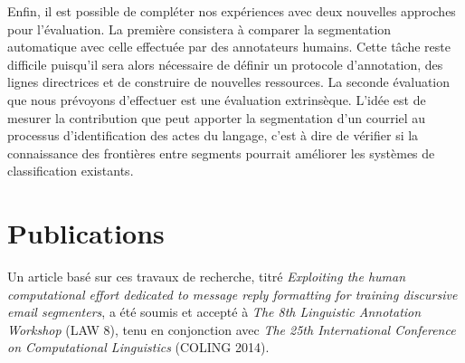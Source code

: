 Enfin, il est possible de compléter nos expériences avec deux nouvelles approches pour l'évaluation. La première consistera à comparer la segmentation automatique avec celle effectuée par des annotateurs humains. Cette tâche reste difficile puisqu'il sera alors nécessaire de définir un protocole d'annotation, des lignes directrices et de construire de nouvelles ressources. La seconde évaluation que nous prévoyons d'effectuer est une évaluation extrinsèque. L'idée est de mesurer la contribution que peut apporter la segmentation d'un courriel au processus d'identification des actes du langage, c'est à dire de vérifier si la connaissance des frontières entre segments pourrait améliorer les systèmes de classification existants.

\section{Publications}

Un article basé sur ces travaux de recherche, titré \textit{Exploiting the human computational effort dedicated to message reply formatting for training discursive email segmenters}, a été soumis et accepté à \textit{The 8th Linguistic Annotation Workshop} (LAW 8), tenu en conjonction avec \textit{The 25th International Conference on Computational Linguistics} (COLING 2014).
